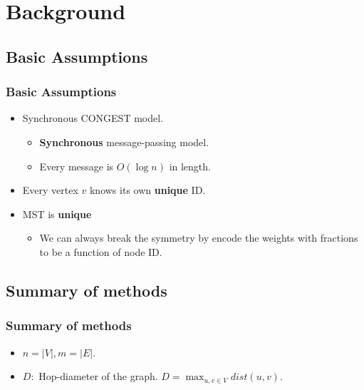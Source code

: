 \section{Background}

\subsection{Basic Assumptions}

\begin{frame}
\frametitle{Basic Assumptions}
\begin{itemize}
\item Synchronous CONGEST model.
\begin{itemize}
    \item \textbf{Synchronous} message-passing model.
    \item Every message is $O(\log n)$ in length.
\end{itemize}
\item Every vertex $v$ knows its own \textbf{unique} ID.
\item MST is \textbf{unique}
\begin{itemize}
    \item We can always break the symmetry by encode the weights with fractions to be a function of node ID.
\end{itemize}
\end{itemize}
\end{frame}

\subsection{Summary of methods}
\begin{frame}
\frametitle{Summary of methods}

\begin{itemize}
    \item $n=|V|, m=|E|.$
    \item $D:$ Hop-diameter of the graph. $D=\max_{u,v \in V} dist(u, v)$.
\end{itemize}

\end{frame}

